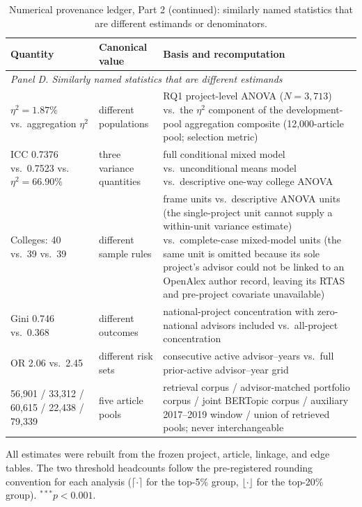 \addtocounter{table}{-1}
\begin{table}[H]
\centering
\caption{Numerical provenance ledger, Part 2 (continued): similarly named statistics that are different estimands or denominators.}
\scriptsize
\begin{tabular}{p{1.55in}p{1.05in}p{3.15in}}
\toprule
\textbf{Quantity} & \textbf{Canonical value} & \textbf{Basis and recomputation}\\
\midrule
\multicolumn{3}{l}{\textit{Panel D. Similarly named statistics that are different estimands}}\\
\midrule
$\eta^2=1.87\%$ vs.\ aggregation $\eta^2$ & different populations & RQ1 project-level ANOVA ($N=3{,}713$) vs.\ the $\eta^2$ component of the development-pool aggregation composite (12,000-article pool; selection metric)\\
ICC 0.7376 vs.\ 0.7523 vs.\ $\eta^2=66.90\%$ & three variance quantities & full conditional mixed model vs.\ unconditional means model vs.\ descriptive one-way college ANOVA\\
Colleges: 40 vs.\ 39 vs.\ 39 & different sample rules & frame units vs.\ descriptive ANOVA units (the single-project unit cannot supply a within-unit variance estimate) vs.\ complete-case mixed-model units (the same unit is omitted because its sole project's advisor could not be linked to an OpenAlex author record, leaving its RTAS and pre-project covariate unavailable)\\
Gini 0.746 vs.\ 0.368 & different outcomes & national-project concentration with zero-national advisors included vs.\ all-project concentration\\
OR 2.06 vs.\ 2.45 & different risk sets & consecutive active advisor--years vs.\ full prior-active advisor--year grid\\
56,901 / 33,312 / 60,615 / 22,438 / 79,339 & five article pools & retrieval corpus / advisor-matched portfolio corpus / joint BERTopic corpus / auxiliary 2017--2019 window / union of retrieved pools; never interchangeable\\
\bottomrule
\end{tabular}

\vspace{1mm}
\footnotesize All estimates were rebuilt from the frozen project, article, linkage, and edge tables. The two threshold headcounts follow the pre-registered rounding convention for each analysis ($\lceil\cdot\rceil$ for the top-5\% group, $\lfloor\cdot\rfloor$ for the top-20\% group). $^{***}p<0.001$.
\end{table}
